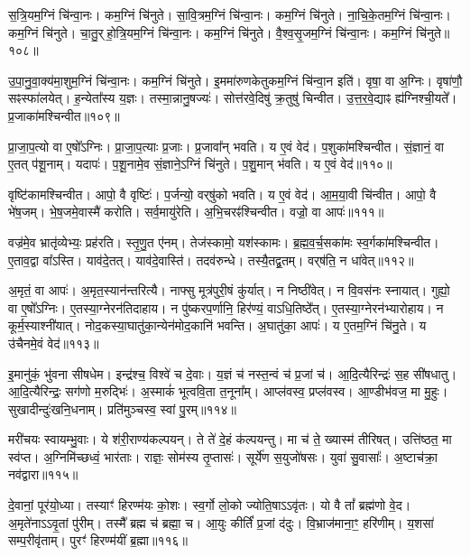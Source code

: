 स॒त्रि॒यम॒ग्निं चि॑न्वा॒नः। कम॒ग्निं चि॑नुते। 
सा॒वि॒त्रम॒ग्निं चि॑न्वा॒नः। कम॒ग्निं चि॑नुते। 
ना॒चि॒के॒तम॒ग्निं चि॑न्वा॒नः। कम॒ग्निं चि॑नुते। 
चा॒तु॒र्‌हो॒त्रि॒य\-म॒ग्निं चि॑न्वा॒नः। कम॒ग्निं चि॑नुते। 
वै॒श्व॒सृ॒जम॒ग्निं चि॑न्वा॒नः। कम॒ग्निं चि॑नुते॥१०८॥


उ॒पा॒नु॒वा॒क्य॑मा॒शुम॒ग्निं चि॑न्वा॒नः। कम॒ग्निं चि॑नुते। 
इ॒म\-मा॑रुण\-केतुक\-म॒ग्निं चि॑न्वा॒न इति॑। वृषा॒ वा अ॒ग्निः। 
वृषा॑णौ॒ सꣴस्फा॑लयेत्। ह॒न्येता᳚स्य य॒ज्ञः। 
तस्मा॒न्नानु॒षज्यः॑। सोत्त॑रवे॒दिषु॑ क्र॒तुषु॑ चिन्वीत। 
उ॒त्त॒र॒वे॒द्याꣴ ह्य॑ग्निश्ची॒यते᳚। प्र॒जाका॑मश्चिन्वीत॥१०९॥


प्रा॒जा॒प॒त्यो वा ए॒षो᳚ऽग्निः। प्रा॒जा॒प॒त्याः प्र॒जाः। 
प्र॒जावा᳚न्‌ भवति। य ए॒वं वेद॑। 
प॒शुका॑मश्चिन्वीत। सं॒ज्ञानं॒ वा ए॒तत् प॑शू॒नाम्। 
यदापः॑। प॒शू॒नामे॒व सं॒ज्ञाने॒ऽग्निं चि॑नुते। 
प॒शु॒मान् भ॑वति। य ए॒वं वेद॑॥११०॥


वृष्टि॑कामश्चिन्वीत। आपो॒ वै वृष्टिः॑। 
प॒र्जन्यो॒ वर्‌षु॑को भवति। य ए॒वं वेद॑। 
आ॒म॒या॒वी चि॑न्वीत। आपो॒ वै भे॑ष॒जम्। 
भे॒ष॒जमे॒वास्मै॑ करोति। सर्व॒मायु॑रेति। 
अ॒भि॒चरꣴ॑श्चिन्वीत। वज्रो॒ वा आपः॑॥१११॥


वज्र॑मे॒व भ्रातृ॑व्येभ्यः॒ प्रह॑रति। स्तृ॒णु॒त ए॑नम्। 
तेज॑स्कामो॒ यश॑स्कामः। ब्र॒ह्म॒व॒र्च॒सका॑मः स्व॒र्गका॑मश्चिन्वीत। 
ए॒ताव॒द्वा वा᳚ऽस्ति। याव॑दे॒तत्। 
याव॑दे॒वास्ति॑। तदव॑रुन्धे। 
तस्यै॒तद्व्र॒तम्। वर्‌ष॑ति॒ न धा॑वेत्॥११२॥


अ॒मृतं॒ वा आपः॑। अ॒मृत॒स्यान॑न्तरित्यै। 
नाफ्सु मूत्र॑पुरी॒षं कु॑र्यात्। न निष्ठी॑वेत्। 
न वि॒वस॑नः स्नायात्। गुह्यो॒ वा ए॒षो᳚ऽग्निः। 
ए॒तस्या॒ग्नेरन॑तिदाहाय। न पु॑ष्करप॒र्णानि॒ हिर॑ण्यं॒ वाऽधि॒तिष्ठे᳚त्। 
ए॒तस्या॒ग्नेरन॑भ्यारोहाय। न कूर्म॒स्याश्नी॑यात्। 
नोद॒कस्या॒घातु॑का॒न्येन॑\-मोद॒कानि॑ भवन्ति। अ॒घातु॑का॒ आपः॑। 
य ए॒तम॒ग्निं चि॑नु॒ते। य उ॑चैनमे॒वं वेद॑॥११३॥\anuvakamend


इ॒मानु॑कं॒ भु॑वना सीषधेम। इन्द्र॑श्च॒ विश्वे॑ च दे॒वाः। 
य॒ज्ञं च॑ नस्त॒न्वं च॑ प्र॒जां च॑। आ॒दि॒त्यैरिन्द्रः॑ स॒ह सी॑षधातु। 
आ॒दि॒त्यैरिन्द्रः॒ सग॑णो म॒रुद्भिः॑। अ॒स्माकं॑ भूत्ववि॒ता त॒नूना᳚म्। 
आप्ल॑वस्व॒ प्रप्ल॑वस्व। आ॒ण्डीभ॑वज॒ मा मु॒हुः। 
सुखादीन्दुः॑खनि॒धनाम्। प्रति॑मुञ्चस्व॒ स्वां पु॒रम्॥११४॥


मरी॑चयः स्वायम्भु॒वाः। ये श॑री॒राण्य॑कल्पयन्। 
ते ते॑ दे॒हं क॑ल्पयन्तु। मा च॑ ते॒ ख्यास्म॑ तीरिषत्। 
उत्ति॑ष्ठत॒ मा स्व॑प्त। अ॒ग्निमि॑च्छध्वं॒ भार॑ताः। 
राज्ञः॒ सोम॑स्य तृ॒प्तासः॑। सूर्ये॑ण स॒युजो॑षसः। 
युवा॑ सु॒वासाः᳚। अ॒ष्टाच॑क्रा॒ नव॑द्वारा॥११५॥


दे॒वानां॒ पूर॑यो॒ध्या। तस्याꣳ॑ हिरण्म॑यः को॒शः। 
स्व॒र्गो लो॒को ज्योति॒षाऽऽवृ॑तः। यो वै तां᳚ ब्रह्म॑णो वे॒द। 
अ॒मृते॑नाऽऽवृ॒तां पु॑रीम्। तस्मै᳚ ब्रह्म च॑ ब्रह्मा॒ च। 
आ॒युः कीर्तिं॑ प्र॒जां द॑दुः। वि॒भ्राज॑माना॒ꣳ॒ हरि॑णीम्। 
य॒शसा॑ सम्प॒रीवृ॑ताम्। पुरꣳ॑ हिरण्म॑यीं ब्र॒ह्मा॥११६॥


